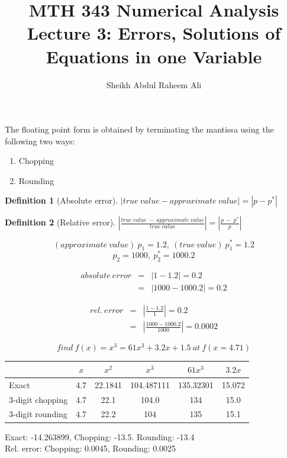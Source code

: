\documentclass[]{article}
\title{MTH 343 Numerical Analysis Lecture 3: Errors, Solutions of Equations in one Variable}
\author{Sheikh Abdul Raheem Ali}
\newtheorem{Def}{Definition}
\begin{document}
\maketitle

The floating point form is obtained by terminating the mantissa using the following two ways:

\begin{enumerate}
	\item Chopping
	\item Rounding
\end{enumerate}

\begin{Def}[Absolute error]
$	|true \ value - approximate \ value| = |p - p^*| $
\end{Def}

\begin{Def}[Relative error]
$ |\frac{true \ value \ - \ approximate \ value}{true \ value}| =  |\frac{p \ - \ p^*}{p}| $
\end{Def}

\[  (approximate \ value ) \ p_1 = 1.2, \ (true \ value) \ p_1^* = 1.2 \]
\[  p_2 = 1000, \ p_2^* = 1000.2 \]

\begin{eqnarray}
absolute \ error &=&  |1 - 1.2| = 0.2 \nonumber \\
&=& |1000 - 1000.2| = 0.2 \nonumber
\end{eqnarray}

\begin{eqnarray}
	rel. \ error &=& |\frac{1 - 1.2}{1}| = 0.2 \nonumber \\
	&=&  |\frac{1000 - 1000.2}{1000}| = 0.0002 \nonumber 
\end{eqnarray}

\[ find \ f(x) = x^3 = 61x^3 + 3.2x + 1.5 \ at \ f(x = 4.71) \]

\begin{tabular}{l c c c c c}
	& $ x $ & $ x^2 $ & $ x^3 $ & $ 61x^3 $ & $ 3.2x $ \\ \hline
	Exact &4.7&22.1841&104.487111&135.32301&15.072\\
	3-digit chopping &4.7&22.1&104.0&134&15.0 \\
	3-digit rounding &4.7&22.2&104&135&15.1 \\
	
\end{tabular}

Exact: -14.263899, Chopping: -13.5. Rounding: -13.4 \\
Rel. error: Chopping: 0.0045, Rounding: 0.0025
\end{document}
